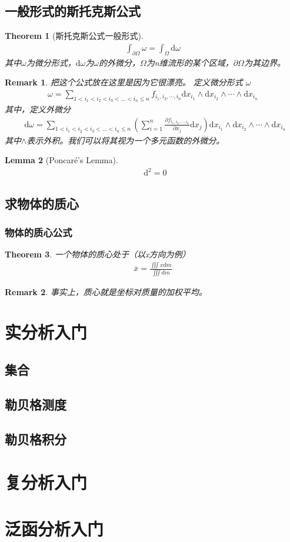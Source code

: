 \documentclass[12pt,a4paper,UTF8]{ctexbook}
\theoremstyle{plain}
\newtheorem{theorem}{\indent Theorem}[section]
\newtheorem{lemma}[theorem]{\indent Lemma}
\newtheorem{remark}{\indent Remark}[section]
\newcommand{\diff}{\mathop{}\!\mathrm{d}} %
\begin{document}
\section{一般形式的斯托克斯公式}
\begin{theorem}[斯托克斯公式一般形式]
\begin{align*}
    \int_{\partial\Omega}\omega =\int_{\Omega}\mathrm d \omega
\end{align*}
其中$\omega$为微分形式，$\mathrm d\omega$为$\omega$的外微分，$\Omega$为n维流形的某个区域，$\partial\Omega$为其边界。
\end{theorem}
\begin{remark}
把这个公式放在这里是因为它很漂亮。
定义微分形式 $\omega$
\begin{align*} 
    \omega = \sum_{1<i_1<i_2<i_3<...<i_n\leq n} f_{i_1,i_2,\cdots,i_n}\mathrm d x_{i_1}\wedge \mathrm d x_{i_2}\wedge \cdots \wedge \mathrm d x_{i_n}
\end{align*}
其中，定义外微分
\begin{align*} 
    \diff \omega = \sum_{1<i_1<i_2<i_3<...<i_n\leq n} (\sum_{i=1}^n\frac{\partial f_{i_1,i_2,\cdots,i_n}}{\partial x_j}\mathrm d x_j) \mathrm d x_{i_1}\wedge \mathrm d x_{i_2}\wedge \cdots \wedge \mathrm d x_{i_n}
\end{align*}
其中$\wedge$表示外积。我们可以将其视为一个多元函数的外微分。
\end{remark}
\begin{lemma}[Poncar\'{e}'s Lemma]
    \begin{align*}
    \diff^2 = 0
    \end{align*}
\end{lemma}
\section{求物体的质心}
\subsection{物体的质心公式}
\begin{theorem}
    一个物体的质心处于（以x方向为例）
    \begin{align*} 
        \overline{x} = \frac{\iiint x \mathrm d m}{\iiint \mathrm dm}
    \end{align*} 
\end{theorem}
\begin{remark}
    事实上，质心就是坐标对质量的加权平均。
\end{remark}

\chapter{实分析入门}
\section{集合}
\section{勒贝格测度}
\section{勒贝格积分}
\chapter{复分析入门}
\chapter{泛函分析入门}
\end{document}
